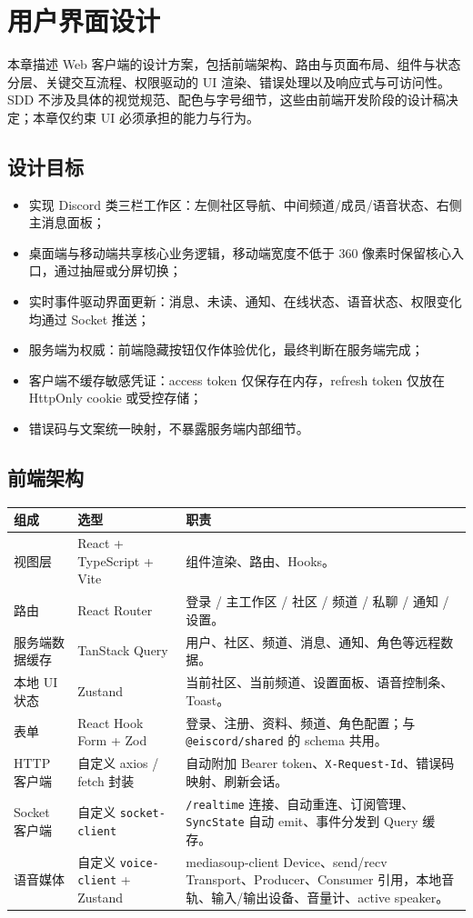 \section{用户界面设计}

本章描述 Web 客户端的设计方案，包括前端架构、路由与页面布局、组件与状态分层、关键交互流程、权限驱动的 UI 渲染、错误处理以及响应式与可访问性。SDD 不涉及具体的视觉规范、配色与字号细节，这些由前端开发阶段的设计稿决定；本章仅约束 UI 必须承担的能力与行为。

\subsection{设计目标}

\begin{itemize}
  \item 实现 Discord 类三栏工作区：左侧社区导航、中间频道/成员/语音状态、右侧主消息面板；
  \item 桌面端与移动端共享核心业务逻辑，移动端宽度不低于 360 像素时保留核心入口，通过抽屉或分屏切换；
  \item 实时事件驱动界面更新：消息、未读、通知、在线状态、语音状态、权限变化均通过 Socket 推送；
  \item 服务端为权威：前端隐藏按钮仅作体验优化，最终判断在服务端完成；
  \item 客户端不缓存敏感凭证：access token 仅保存在内存，refresh token 仅放在 HttpOnly cookie 或受控存储；
  \item 错误码与文案统一映射，不暴露服务端内部细节。
\end{itemize}

\subsection{前端架构}

\noindent\begin{tabularx}{\textwidth}{L{3.4cm}L{3.4cm}Y}
  \toprule
  组成 & 选型 & 职责 \\
  \midrule
  视图层 & React + TypeScript + Vite & 组件渲染、路由、Hooks。 \\
  路由 & React Router & 登录 / 主工作区 / 社区 / 频道 / 私聊 / 通知 / 设置。 \\
  服务端数据缓存 & TanStack Query & 用户、社区、频道、消息、通知、角色等远程数据。 \\
  本地 UI 状态 & Zustand & 当前社区、当前频道、设置面板、语音控制条、Toast。 \\
  表单 & React Hook Form + Zod & 登录、注册、资料、频道、角色配置；与 \texttt{@eiscord/shared} 的 schema 共用。 \\
  HTTP 客户端 & 自定义 axios / fetch 封装 & 自动附加 Bearer token、\texttt{X-Request-Id}、错误码映射、刷新会话。 \\
  Socket 客户端 & 自定义 \texttt{socket-client} & \texttt{/realtime} 连接、自动重连、订阅管理、\texttt{SyncState} 自动 emit、事件分发到 Query 缓存。 \\
  语音媒体 & 自定义 \texttt{voice-client} + Zustand & mediasoup-client Device、send/recv Transport、Producer、Consumer 引用，本地音轨、输入/输出设备、音量计、active speaker。 \\
  \bottomrule
\end{tabularx}

